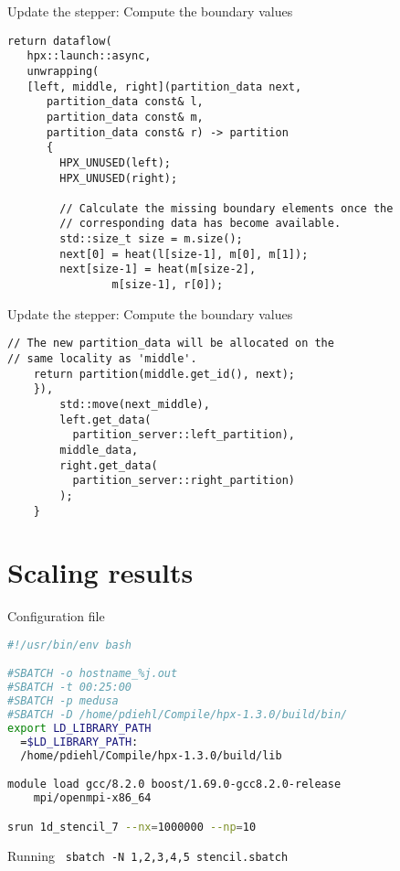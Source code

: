 \documentclass[12pt,t]{beamer}
\begin{document}
\begin{frame}[fragile]{Update the stepper: Compute the boundary values}

\begin{lstlisting}
return dataflow(
   hpx::launch::async,
   unwrapping(
   [left, middle, right](partition_data next, 
      partition_data const& l,
      partition_data const& m, 
      partition_data const& r) -> partition
      {
        HPX_UNUSED(left);
        HPX_UNUSED(right);

        // Calculate the missing boundary elements once the
        // corresponding data has become available.
        std::size_t size = m.size();
        next[0] = heat(l[size-1], m[0], m[1]);
        next[size-1] = heat(m[size-2], 
        		m[size-1], r[0]);
\end{lstlisting}

\end{frame}

\begin{frame}[fragile]{Update the stepper: Compute the boundary values}

\begin{lstlisting}
// The new partition_data will be allocated on the 
// same locality as 'middle'.
	return partition(middle.get_id(), next);
	}),
		std::move(next_middle),
		left.get_data(
		  partition_server::left_partition),
		middle_data,
		right.get_data(
		  partition_server::right_partition)
        );
    }
\end{lstlisting}

\end{frame}


\section{Scaling results}

\begin{frame}[fragile]{Configuration file}

\begin{lstlisting}[language=bash]
#!/usr/bin/env bash

#SBATCH -o hostname_%j.out
#SBATCH -t 00:25:00
#SBATCH -p medusa
#SBATCH -D /home/pdiehl/Compile/hpx-1.3.0/build/bin/
export LD_LIBRARY_PATH
  =$LD_LIBRARY_PATH:
  /home/pdiehl/Compile/hpx-1.3.0/build/lib

module load gcc/8.2.0 boost/1.69.0-gcc8.2.0-release 
	mpi/openmpi-x86_64   

srun 1d_stencil_7 --nx=1000000 --np=10 
\end{lstlisting}

\begin{block}{Running}
\lstinline| sbatch -N 1,2,3,4,5 stencil.sbatch|
\end{block}

\end{frame}
\end{document}
